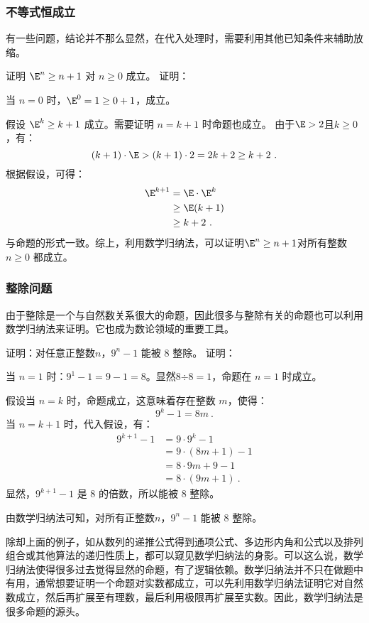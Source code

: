 \subsubsection{不等式恒成立}

有一些问题，结论并不那么显然，在代入处理时，需要利用其他已知条件来辅助放缩。

\begin{example}{证明 $\E^n \geq n+1$ 对 $n \geq 0$ 成立。}
证明：

当 $n = 0$ 时，$\E^0 = 1\geq 0+1$，成立。

假设 $\E^k \geq k+1$ 成立。需要证明 $n = k+1$ 时命题也成立。
由于$\E>2$且$k\geq0$，有：
\begin{equation}
(k + 1) \cdot \E > (k + 1) \cdot 2 = 2k + 2 \geq k + 2~.
\end{equation}
根据假设，可得：
\begin{equation}
\begin{aligned}
\E^{k+1} &= \E \cdot \E^k\\
&\geq \E(k+1)\\
&\geq k+2~.
\end{aligned}
\end{equation}
与命题的形式一致。综上，利用数学归纳法，可以证明$\E^n \geq n+1$对所有整数$n \geq 0$ 都成立。
\end{example}

\subsubsection{整除问题}

由于整除是一个与自然数关系很大的命题，因此很多与整除有关的命题也可以利用数学归纳法来证明。它也成为数论领域的重要工具。

\begin{example}{证明：对任意正整数$n$，$9^{n} - 1$ 能被 $8$ 整除。}
证明：

当 $n = 1$ 时：$9^1 - 1 = 9 - 1 = 8$。显然$8\text{÷}8=1$，命题在 $n = 1$ 时成立。

假设当 $n = k$ 时，命题成立，这意味着存在整数 $m$，使得：
\begin{equation}
9^k - 1 = 8m~.
\end{equation}
当 $n = k+1$ 时，代入假设，有：
\begin{equation}
\begin{aligned}
9^{k+1} - 1 &= 9\cdot9^{k} - 1\\
&= 9\cdot(8m+1)- 1\\
&= 8\cdot9m+9- 1\\
&= 8\cdot(9m+1)~.
\end{aligned}
\end{equation}
显然，$9^{k+1} - 1$ 是 $8$ 的倍数，所以能被 $8$ 整除。

由数学归纳法可知，对所有正整数$n$，$9^{n} - 1$ 能被 $8$ 整除。
\end{example}
除却上面的例子，如从数列的递推公式得到通项公式、多边形内角和公式以及排列组合或其他算法的递归性质上，都可以窥见数学归纳法的身影。可以这么说，数学归纳法使得很多过去觉得显然的命题，有了逻辑依赖。数学归纳法并不只在做题中有用，通常想要证明一个命题对实数都成立，可以先利用数学归纳法证明它对自然数成立，然后再扩展至有理数，最后利用极限再扩展至实数。因此，数学归纳法是很多命题的源头。



